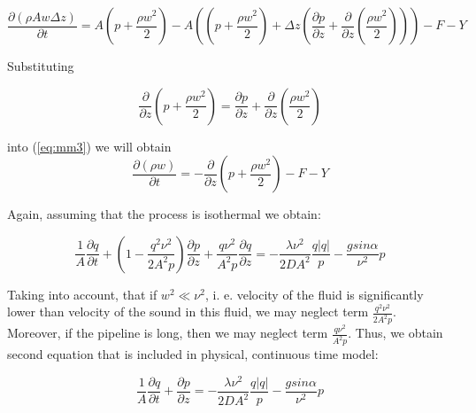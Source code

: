 \begin{equation}
\label{eq:mm3}
\frac{\partial \left( \rho A w \Delta z \right)}{\partial t} = A \left(p + \frac{\rho w^2}{2} \right) - A\left(\left(p + \frac{\rho w^2}{2} \right) + \Delta z \left( \frac{\partial p}{\partial z} +  \frac{\partial}{\partial z} \left( \frac{\rho w^2}{2} \right) \right)\right) - F - Y
\end{equation}

Substituting 

\begin{equation}
\label{eq:mm4}
 \frac{\partial}{\partial z} \left(p +  \frac{\rho w^2}{2} \right) = \frac{\partial p}{\partial z} +  \frac{\partial}{\partial z} \left( \frac{\rho w^2}{2} \right) 
\end{equation}

into (\ref{eq:mm3}) we will obtain
\begin{equation}
\label{eq:mm5}
\frac{\partial \left( \rho  w  \right)}{\partial t} = -  \frac{\partial}{\partial z} \left(p +  \frac{\rho w^2}{2} \right) - F- Y
\end{equation}

Again, assuming that the process is isothermal we obtain:

\begin{equation}
\label{eq:mm_fin}
\frac{1}{A} \frac{\partial q}{\partial t} + \left( 1 - \frac{q^2 \nu^2}{2 A^2 p}\right) \frac{\partial p}{\partial z} + \frac{q \nu^2}{A^2 p} \frac{\partial q}{\partial z}= - \frac{\lambda \nu^2}{2DA^2} \frac{q|q|}{p} - \frac{g sin \alpha}{\nu^2} p
\end{equation}

Taking into account, that if $w^2 \ll \nu^2$, i. e. velocity of the fluid is significantly lower than velocity of the sound in this fluid, we may neglect term $ \frac{q^2 \nu^2}{2 A^2 p}$. Moreover, if the pipeline is long, then we may neglect term $ \frac{q \nu^2}{A^2 p}$. Thus, we obtain second equation that is included in physical, continuous time model:

\begin{equation}
\label{eq:momen_fin3}
\frac{1}{A} \frac{\partial q}{\partial t} + \frac{\partial p}{\partial z} = - \frac{\lambda \nu^2}{2DA^2} \frac{q|q|}{p} - \frac{g sin \alpha}{\nu^2} p
\end{equation}
